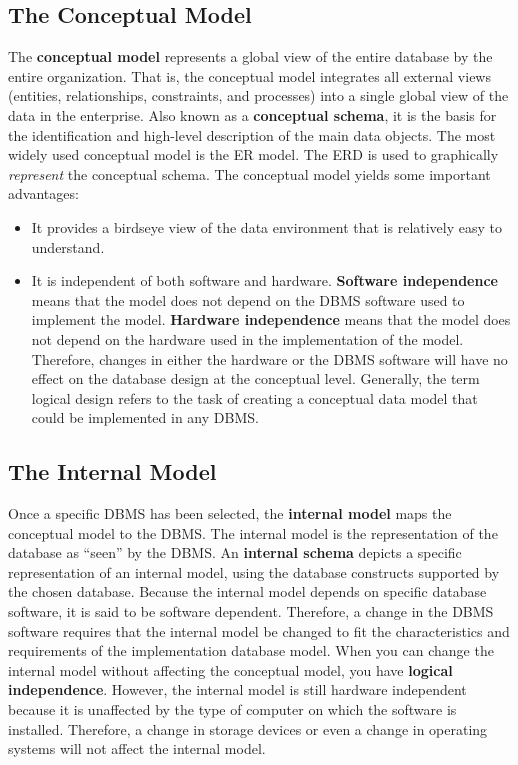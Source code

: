 \documentclass[a4paper, 12pt, titlepage]{report}
\begin{document}
\subsection{The Conceptual Model}
The \textbf{conceptual model} represents a global view of the entire database by the entire organization. That is, the conceptual model integrates all external views (entities, relationships, constraints, and processes) into a single global view of the data in the enterprise. Also known as a \textbf{conceptual schema}, it is the basis for the identification and high-level description of the main data objects. The most widely used conceptual model is the ER model. The ERD is used to graphically \emph{represent} the conceptual schema. The conceptual model yields some important advantages:
\begin{itemize}
\item It provides a birdseye view of the data environment that is relatively easy to understand.
\item It is independent of both software and hardware. \textbf{Software independence} means that the model does not depend on the DBMS software used to implement the model. \textbf{Hardware independence} means that the model does not depend on the hardware used in the implementation of the model. Therefore, changes in either the hardware or the DBMS software will have no effect on the database design at the conceptual level. Generally, the term logical design refers to the task of creating a conceptual data model that could be implemented in any DBMS.
\end{itemize}

\subsection{The Internal Model}
Once a specific DBMS has been selected, the \textbf{internal model} maps the conceptual model to the DBMS. The internal model is the representation of the database as “seen” by the DBMS. An \textbf{internal schema} depicts a specific representation of an internal model, using the database constructs supported by the chosen database. Because the internal model depends on specific database software, it is said to be software dependent. Therefore, a change in the DBMS software requires that the internal model be changed to fit the characteristics and requirements of the implementation database model. When you can change the internal model without affecting the conceptual model, you have \textbf{logical independence}. However, the internal model is still hardware independent because it is unaffected by the type of computer on which the software is installed. Therefore, a change in storage devices or even a change in operating systems will not affect the internal model.
\end{document}
